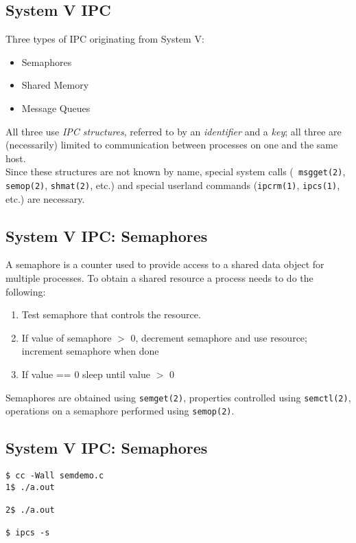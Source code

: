 \documentclass[xga]{xdvislides}
\begin{document}
\subsection{System V IPC}
Three types of IPC originating from System V:
\begin{itemize}
	\item Semaphores
	\item Shared Memory
	\item Message Queues
\end{itemize}
\vspace{.5in}

All three use {\em IPC structures}, referred to by an {\em identifier} and a
{\em key}; all three are (necessarily) limited to communication between
processes on one and the same host.
\\

Since these structures are not known by name, special system calls ({\tt
msgget(2)}, {\tt semop(2)}, {\tt shmat(2)}, etc.) and special userland
commands ({\tt ipcrm(1)}, {\tt ipcs(1)}, etc.) are necessary.


\subsection{System V IPC: Semaphores}
A semaphore is a counter used to provide access to a shared data object for
multiple processes.  To obtain a shared resource a process needs to do the
following: \\

\begin{enumerate}
	\item Test semaphore that controls the resource.
	\item If value of semaphore $>$ 0, decrement semaphore and use resource;
		increment semaphore when done
	\item If value == 0 sleep until value $>$ 0
\end{enumerate}
\vspace{.5in}
Semaphores are obtained using {\tt semget(2)}, properties controlled using
{\tt semctl(2)}, operations on a semaphore performed using {\tt semop(2)}.

\subsection{System V IPC: Semaphores}
\begin{verbatim}
$ cc -Wall semdemo.c
1$ ./a.out

2$ ./a.out

$ ipcs -s
\end{verbatim}
\end{document}
